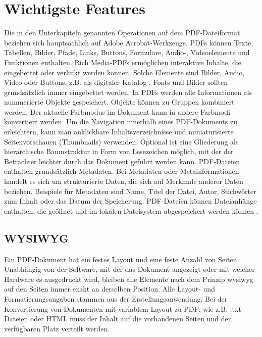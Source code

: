 \section{Wichtigste Features}
Die in den Unterkapiteln genannten Operationen auf dem PDF-Dateiformat beziehen sich hauptsächlich auf Adobe Acrobat-Werkzeuge. PDFs können Texte, Tabellen, Bilder, Pfade, Links, Buttons, Formulare, Audio-, Videoelemente und Funktionen enthalten. Rich Media-PDFs ermöglichen interaktive Inhalte, die eingebettet oder verlinkt werden können. Solche Elemente sind Bilder, Audio, Video oder Buttons, z.B. als digitaler Katalog \cite{wiki-pdf-engl}. Fonts und Bilder sollten grundsätzlich immer eingebettet werden. In PDFs werden alle Informationen als nummerierte Objekte gespeichert. Objekte können zu Gruppen kombiniert werden. Der aktuelle Farbmodus im Dokument kann in andere Farbmodi konvertiert werden. Um die Navigation innerhalb eines PDF-Dokuments zu erleichtern, kann man anklickbare Inhaltsverzeichnisse und miniaturisierte Seitenvorschauen (Thumbnails) verwenden. Optional ist eine Gliederung als hierarchische Baumstruktur in Form von Lesezeichen möglich, mit der der Betrachter leichter durch das Dokument geführt werden kann. PDF-Dateien enthalten grundsätzlich Metadaten. Bei Metadaten oder Metainformationen handelt es sich um strukturierte Daten, die sich auf Merkmale anderer Daten beziehen. Beispiele für Metadaten sind Name, Titel der Datei, Autor, Stichwörter zum Inhalt oder das Datum der Speicherung. PDF-Dateien können Dateianhänge enthalten, die geöffnet und im lokalen Dateisystem abgespeichert werden können \cite{wiki-pdf-engl}. 

\subsection{WYSIWYG}
Ein PDF-Dokument hat ein festes Layout und eine feste Anzahl von Seiten. Unabhängig von der Software, mit der das Dokument angezeigt oder mit welcher Hardware es ausgedruckt wird, bleiben alle Elemente nach dem Prinzip \gls{wysiwyg} auf den Seiten immer exakt an derselben Position. Alle Layout- und Formatierungsangaben stammen aus der Erstellungsanwendung. Bei der Konvertierung von Dokumenten mit variablem Layout zu PDF, wie z.B. .txt-Dateien oder HTML muss der Inhalt auf die vorhandenen Seiten und den verfügbaren Platz verteilt werden. 

